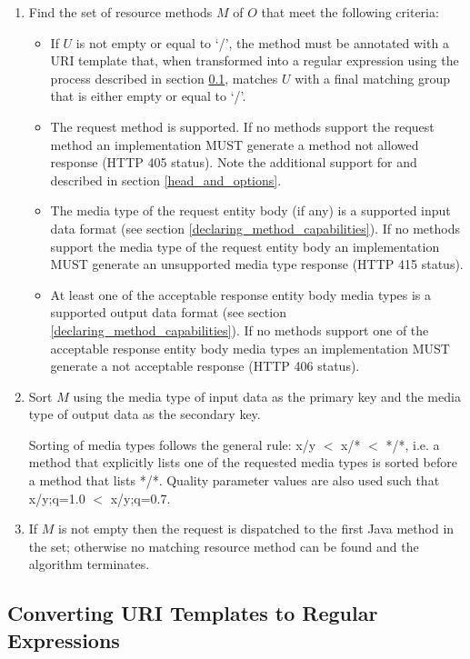 \begin{enumerate}
\begin{enumerate}
\item Find the set of resource methods $M$ of $O$ that meet the following criteria:
\begin{itemize}
\item If $U$ is not empty or equal to \lq/\rq, the method must be annotated with  a URI template that, when transformed into a regular expression using the process described in section \ref{template_to_regex}, matches $U$ with a final matching group that is either empty or equal to \lq/\rq.
\item The request method is supported. If no methods support the request method an implementation MUST generate a method not allowed response (HTTP 405 status). Note the additional support for  and  described in section \ref{head_and_options}.
\item The media type of the request entity body (if any) is a supported input data format (see section \ref{declaring_method_capabilities}). If no methods support the media type of the request entity body an implementation MUST generate an unsupported media type response (HTTP 415 status).
\item At least one of the acceptable response entity body media types is a supported output data format (see section \ref{declaring_method_capabilities}). If no methods support one of the acceptable response entity body media types an implementation MUST generate a not acceptable response (HTTP 406 status).
\end{itemize} 
\item Sort $M$ using the media type of input data as the primary key and the media type of output data as the secondary key.

Sorting of media types follows the general rule: x/y $<$ x/* $<$ */*, i.e. a method that explicitly lists one of the requested media types is sorted before a method that lists */*. Quality parameter values are also used such that x/y;q=1.0 $<$ x/y;q=0.7.

\item \label{dispatch_method} If $M$ is not empty then the request is dispatched to the first Java method in the set; otherwise no matching resource method can be found and the algorithm terminates.
\end{enumerate}

\end{enumerate}

\subsection{Converting URI Templates to Regular Expressions}
\label{template_to_regex}

